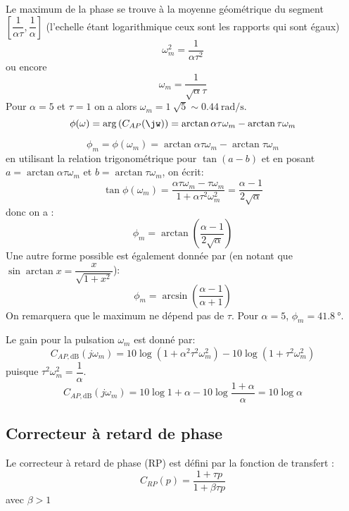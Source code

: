\begin{center}
    
\end{center}

Le maximum de la phase se trouve à la moyenne géométrique du segment 
$\left[\dfrac{1}{\alpha\tau},\dfrac{1}{\alpha}\right]$ (l'echelle étant logarithmique 
ceux sont les rapports qui sont égaux)
\[
    \omega_m^2=\dfrac{1}{\alpha\tau^2}
\]
ou encore 
\[
    \omega_m=\dfrac{1}{\sqrt{\alpha}\tau}
\]
Pour $\alpha=5$ et $\tau=1$ on a alors $\omega_m=\SI{1}{\sqrt{5}}\sim\SI{0.44}{\radian\per\second}$.
\[
    \phi(\omega)=\arg{(C_{AP}(\jw))}=\arctan{\alpha\tau\omega_m}-\arctan{\tau\omega_m}
\]

\[
    \phi_m=\phi(\omega_m)=\arctan{\alpha\tau\omega_m}-\arctan{\tau\omega_m}
\]
en utilisant la relation trigonométrique pour $\tan{(a-b)}$ et en posant $a=\arctan{\alpha\tau\omega_m}$ 
et $b=\arctan{\tau\omega_m}$, on écrit:
\[
    \tan{\phi(\omega_m)}=\dfrac{\alpha\tau\omega_m-\tau\omega_m}{1+\alpha\tau^2\omega_m^2}
                        =\dfrac{\alpha-1}{2\sqrt{\alpha}}
\]
donc on a :
\[
    \phi_m=\arctan{\left(\dfrac{\alpha-1}{2\sqrt{\alpha}}\right)}
\]
Une autre forme possible est également donnée par (en notant que $\sin\arctan{x}=\dfrac{x}{\sqrt{1+x^2}}$):
\[
    \phi_m=\arcsin{\left(\dfrac{\alpha-1}{\alpha+1}\right)}
\]
On remarquera que le maximum ne dépend pas de $\tau$.
Pour $\alpha=5$, $\phi_m=\SI{41.8}{\degree}$.

Le gain pour la pulsation $\omega_m$ est donné par:
\[
    C_{AP,\si{\dB}}(j\omega_m)=10\log{(1+\alpha^2\tau^2\omega_m^2)}-
                               10\log{(1+\tau^2\omega_m^2)}
\]
puisque $\tau^2\omega_m^2=\dfrac{1}{\alpha}$.
\[
    C_{AP,\si{\dB}}(j\omega_m)=10\log{1+\alpha}-10\log{\dfrac{1+\alpha}{\alpha}}=10\log{\alpha}
\]

\subsection{Correcteur à retard de phase}
Le correcteur à retard de phase (RP) est défini par la fonction de transfert :
\[
    C_{RP}(p)=\dfrac{1+\tau p}{1+\beta\tau p}
\]
avec $\beta>1$

